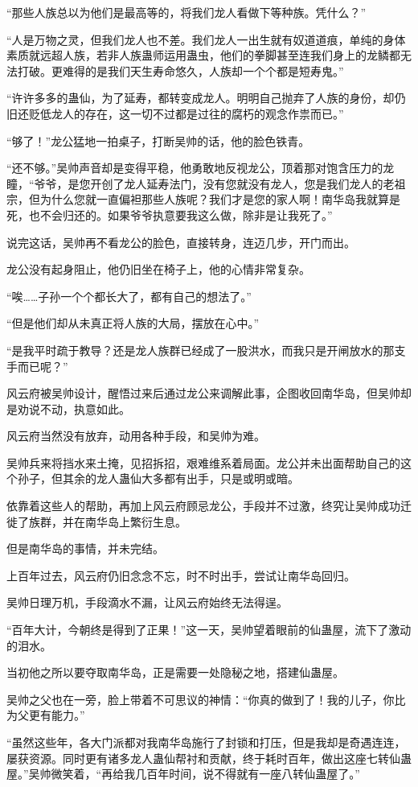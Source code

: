 \begin{this_body}
“那些人族总以为他们是最高等的，将我们龙人看做下等种族。凭什么？”

“人是万物之灵，但我们龙人也不差。我们龙人一出生就有奴道道痕，单纯的身体素质就远超人族，若非人族蛊师运用蛊虫，他们的拳脚甚至连我们身上的龙鳞都无法打破。更难得的是我们天生寿命悠久，人族却一个个都是短寿鬼。”

“许许多多的蛊仙，为了延寿，都转变成龙人。明明自己抛弃了人族的身份，却仍旧还贬低龙人的存在，这一切不过都是过往的腐朽的观念作祟而已。”

“够了！”龙公猛地一拍桌子，打断吴帅的话，他的脸色铁青。

“还不够。”吴帅声音却是变得平稳，他勇敢地反视龙公，顶着那对饱含压力的龙瞳，“爷爷，是您开创了龙人延寿法门，没有您就没有龙人，您是我们龙人的老祖宗，但为什么您就一直偏袒那些人族呢？我们才是您的家人啊！南华岛我就算是死，也不会归还的。如果爷爷执意要我这么做，除非是让我死了。”

说完这话，吴帅再不看龙公的脸色，直接转身，连迈几步，开门而出。

龙公没有起身阻止，他仍旧坐在椅子上，他的心情非常复杂。

“唉……子孙一个个都长大了，都有自己的想法了。”

“但是他们却从未真正将人族的大局，摆放在心中。”

“是我平时疏于教导？还是龙人族群已经成了一股洪水，而我只是开闸放水的那支手而已呢？”

风云府被吴帅设计，醒悟过来后通过龙公来调解此事，企图收回南华岛，但吴帅却是劝说不动，执意如此。

风云府当然没有放弃，动用各种手段，和吴帅为难。

吴帅兵来将挡水来土掩，见招拆招，艰难维系着局面。龙公并未出面帮助自己的这个孙子，但其余的龙人蛊仙大多都有出手，只是或明或暗。

依靠着这些人的帮助，再加上风云府顾忌龙公，手段并不过激，终究让吴帅成功迁徙了族群，并在南华岛上繁衍生息。

但是南华岛的事情，并未完结。

上百年过去，风云府仍旧念念不忘，时不时出手，尝试让南华岛回归。

吴帅日理万机，手段滴水不漏，让风云府始终无法得逞。

“百年大计，今朝终是得到了正果！”这一天，吴帅望着眼前的仙蛊屋，流下了激动的泪水。

当初他之所以要夺取南华岛，正是需要一处隐秘之地，搭建仙蛊屋。

吴帅之父也在一旁，脸上带着不可思议的神情：“你真的做到了！我的儿子，你比为父更有能力。”

“虽然这些年，各大门派都对我南华岛施行了封锁和打压，但是我却是奇遇连连，屡获资源。同时更有诸多龙人蛊仙帮衬和贡献，终于耗时百年，做出这座七转仙蛊屋。”吴帅微笑着，“再给我几百年时间，说不得就有一座八转仙蛊屋了。”


\end{this_body}
